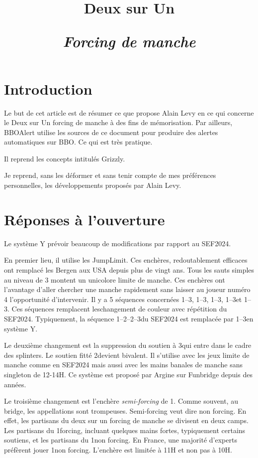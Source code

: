 \documentclass[a4paper,12pt, french, twocolumn]{article}
\title{Deux sur Un\par \textit{Forcing de manche}}
\date{}
\author{}
\newcommand{\T}{\Cl}
\newcommand{\K}{\Di}
\newcommand{\C}{\He}
\renewcommand{\P}{\Sp}
\begin{document}
\maketitle




\section*{Introduction}
Le but de cet article est de résumer ce que propose Alain Levy en ce qui concerne le Deux sur Un forcing de manche à des fins de mémorisation.
Par ailleurs, BBOAlert utilise les sources de ce document pour produire des alertes automatiques sur BBO. Ce qui est très pratique.

Il reprend les concepts intitulés Grizzly.

Je reprend, sans les déformer et sans tenir compte de mes préférences personnelles, les développements proposés par Alain Levy.


\section*{Réponses à l'ouverture}

Le système Y prévoir beaucoup de modifications par rapport au SEF2024.

En premier lieu, il utilise les JumpLimit. Ces enchères, redoutablement efficaces ont remplacé les Bergen aux USA depuis plus de vingt ans. Tous les sauts simples au niveau de 3 montent un unicolore limite de manche. Ces enchères ont l'avantage d'aller chercher une manche rapidement sans laisser au joueur numéro 4 l'opportunité d'intervenir. Il y a 5 séquences concernées 1\C--3\T, 1\C--3\K, 1\P--3\T, 1\P--3\K et 1\P--3\C. Ces séquences remplacent leschangement de couleur avec répétition du SEF2024. Typiquement, la séquence 1\P--2\T--2\P--3\T du SEF2024 est remplacée par 1\P--3\T en système Y.

Le deuxième changement est la suppression du soutien à 3\NT qui entre dans le cadre des splinters. Le soutien fitté 2\NT devient bivalent. Il s'utilise avec les jeux limite de manche comme en SEF2024 mais aussi avec les mains banales de manche sans singleton de 12-14H. Ce système est proposé par Argine sur Funbridge depuis des années.

Le troisième changement est l'enchère \textit{semi-forcing }de 1\NT. Comme souvent, au bridge, les appellations sont trompeuses. Semi-forcing veut dire non forcing. En effet, les partisans du deux sur un forcing de manche se divisent en deux camps. Les partisans du 1\NT forcing, incluant quelques mains fortes, typiquement certains soutiens, et les partisans du 1\NT non forcing. En France, une majorité d'experts préfèrent jouer 1\NT non forcing. L'enchère est limitée à 11H et non pas à 10H.
\end{document}
